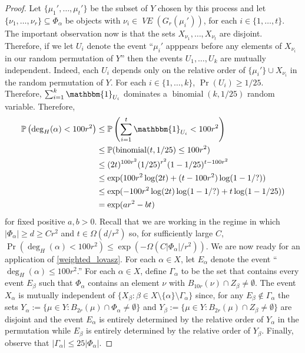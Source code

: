 \documentclass{patmorin}
\DeclareMathOperator{\binomial}{binomial}
\DeclareMathOperator{\VE}{\mathit{VE}}
\begin{document}
\begin{proof}
  Let $\{\mu_1',\ldots,\mu_t'\}$ be the subset of $Y$ chosen by this process and let $\{\nu_1,\ldots,\nu_r\}\subseteq\Phi_\alpha$ be objects with $\nu_i\in\VE(G_r(\mu_i'))$, for each $i\in\{1,\ldots,t\}$.  The important observation now is that the sets $X_{\nu_1},\ldots,X_{\nu_t}$ are disjoint.  Therefore, if we let $U_i$ denote the event ``$\mu_i'$ apppears before any elements of $X_{\nu_i}$ in our random permutation of $Y$'' then the events $U_1,\ldots,U_k$ are mutually independent.  Indeed, each $U_i$ depends only on the relative order of $\{\mu_i'\}\cup X_{\nu_i}$ in the random permutation of $Y$.  For each $i\in\{1,\ldots,k\}$, $\Pr(U_i)\ge 1/25$.  Therefore, $\sum_{i=1}^k \mathbbm{1}_{U_i}$ dominates a $\binomial(k,1/25)$ random variable.  Therefore,
  \begin{align*}
    \Pr\left(\deg_H(\alpha)< 100r^2\right)
    & \le \Pr\left(\sum_{i=1}^t \mathbbm{1}_{U_i} < 100r^2\right) \\
    & \le \Pr(\binomial(t,1/25)\le 100r^2) \\
    & \le (2t)^{100r^2}(1/25)^{r^2}(1-1/25)^{t-100r^2} \\
    & \le \exp(100r^2\log(2t)+(t-100r^2)\log(1-1/?)) \\
    & \le \exp(-100r^2\log(2t)\log(1-1/?) + t\log(1-1/25)) \\
    & = \exp(ar^2 - bt)
  \end{align*}
  for fixed positive $a,b>0$.  Recall that we are working in the regime in which $|\Phi_\alpha|\ge d\ge Cr^2$ and $t\in\Omega(d/r^2)$ so, for sufficiently large $C$,
  $\Pr(\deg_H(\alpha)< 100r^2)\le \exp(-\Omega(C|\Phi_\alpha|/r^2))$.
  We are now ready for an application of \cref{weighted_lovasz}.  For each $\alpha\in X$, let $E_\alpha$ denote the event ``$\deg_H(\alpha)\le 100r^2$.''  For each $\alpha\in X$, define $\Gamma_\alpha$ to be the set that contains every event $E_\beta$ such that $\Phi_\alpha$ contains an element $\nu$ with $B_{10r}(\nu)\cap Z_\beta\neq\emptyset$.  The event $X_\alpha$ is mutually independent of $\{X_\beta:\beta\in X\setminus\{\alpha\}\setminus\Gamma_\alpha\}$ since, for any $E_\beta\not\in \Gamma_\alpha$ the sets $Y_\alpha:=\{\mu\in Y:B_{2r}(\mu)\cap \Phi_\alpha\neq\emptyset\}$ and $Y_\beta:=\{\mu\in Y:B_{2r}(\mu)\cap Z_\beta\neq\emptyset\}$ are disjoint and the event $E_\alpha$ is entirely determined by the relative order of $Y_\alpha$ in the permutation while $E_\beta$ is entirely determined by the relative order of $Y_\beta$.   Finally, observe that $|\Gamma_\alpha|\le 25|\Phi_\alpha|$.


\end{proof}
\end{document}
